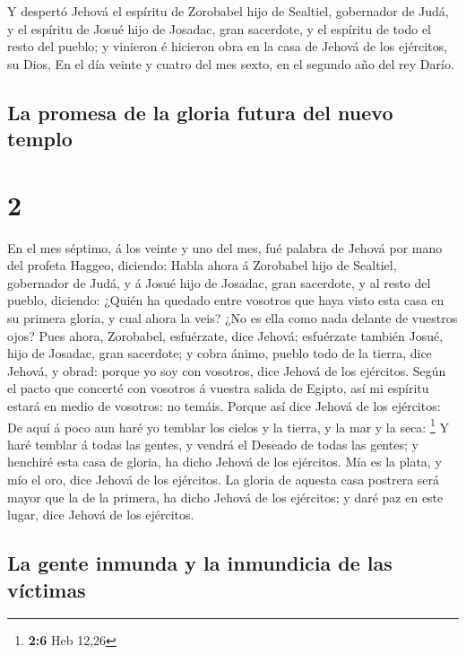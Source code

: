  Y despertó Jehová el espíritu de Zorobabel hijo de
Sealtiel, gobernador de Judá, y el espíritu de Josué hijo de Josadac,
gran sacerdote, y el espíritu de todo el resto del pueblo; y vinieron é
hicieron obra en la casa de Jehová de los ejércitos, su Dios,
 En el día veinte y cuatro del mes sexto, en el segundo año
del rey Darío.

\hypertarget{la-promesa-de-la-gloria-futura-del-nuevo-templo}{%
\subsection{La promesa de la gloria futura del nuevo
templo}\label{la-promesa-de-la-gloria-futura-del-nuevo-templo}}

\hypertarget{section-1}{%
\section{2}\label{section-1}}

 En el mes séptimo, á los veinte y uno del mes, fué palabra
de Jehová por mano del profeta Haggeo, diciendo:  Habla
ahora á Zorobabel hijo de Sealtiel, gobernador de Judá, y á Josué hijo
de Josadac, gran sacerdote, y al resto del pueblo, diciendo:
 ¿Quién ha quedado entre vosotros que haya visto esta casa
en su primera gloria, y cual ahora la veis? ¿No es ella como nada
delante de vuestros ojos?  Pues ahora, Zorobabel,
esfuérzate, dice Jehová; esfuérzate también Josué, hijo de Josadac, gran
sacerdote; y cobra ánimo, pueblo todo de la tierra, dice Jehová, y
obrad: porque yo soy con vosotros, dice Jehová de los ejércitos.
 Según el pacto que concerté con vosotros á vuestra salida
de Egipto, así mi espíritu estará en medio de vosotros: no temáis.
 Porque así dice Jehová de los ejércitos: De aquí á poco aun
haré yo temblar los cielos y la tierra, y la mar y la seca: \footnote{\textbf{2:6}
  Heb 12,26}  Y haré temblar á todas las gentes, y vendrá el
Deseado de todas las gentes; y henchiré esta casa de gloria, ha dicho
Jehová de los ejércitos.  Mía es la plata, y mío el oro,
dice Jehová de los ejércitos.  La gloria de aquesta casa
postrera será mayor que la de la primera, ha dicho Jehová de los
ejércitos; y daré paz en este lugar, dice Jehová de los ejércitos.

\hypertarget{la-gente-inmunda-y-la-inmundicia-de-las-vuxedctimas}{%
\subsection{La gente inmunda y la inmundicia de las
víctimas}\label{la-gente-inmunda-y-la-inmundicia-de-las-vuxedctimas}}

